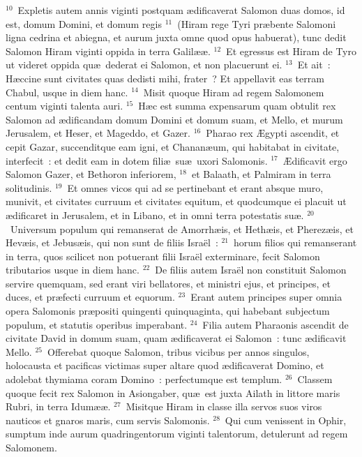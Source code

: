 ${}^{10}$~Expletis autem annis viginti postquam \ae dificaverat Salomon duas domos, id est, domum Domini, et domum regis
${}^{11}$~(Hiram rege Tyri pr\ae bente Salomoni ligna cedrina et abiegna, et aurum juxta omne quod opus habuerat), tunc dedit Salomon Hiram viginti oppida in terra Galil\ae \ae .
${}^{12}$~Et egressus est Hiram de Tyro ut videret oppida qu\ae\ dederat ei Salomon, et non placuerunt ei.
${}^{13}$~Et ait~: H\ae ccine sunt civitates quas dedisti mihi, frater~? Et appellavit eas terram Chabul, usque in diem hanc.
${}^{14}$~Misit quoque Hiram ad regem Salomonem centum viginti talenta auri.
${}^{15}$~H\ae c est summa expensarum quam obtulit rex Salomon ad \ae dificandam domum Domini et domum suam, et Mello, et murum Jerusalem, et Heser, et Mageddo, et Gazer.
${}^{16}$~Pharao rex \AE gypti ascendit, et cepit Gazar, succenditque eam igni, et Chanan\ae um, qui habitabat in civitate, interfecit~: et dedit eam in dotem fili\ae\ su\ae\ uxori Salomonis.
${}^{17}$~\AE dificavit ergo Salomon Gazer, et Bethoron inferiorem,
${}^{18}$~et Balaath, et Palmiram in terra solitudinis.
${}^{19}$~Et omnes vicos qui ad se pertinebant et erant absque muro, munivit, et civitates curruum et civitates equitum, et quodcumque ei placuit ut \ae dificaret in Jerusalem, et in Libano, et in omni terra potestatis su\ae .
${}^{20}$~Universum populum qui remanserat de Amorrh\ae is, et Heth\ae is, et Pherez\ae is, et Hev\ae is, et Jebus\ae is, qui non sunt de filiis Isra\"el~:
${}^{21}$~horum filios qui remanserant in terra, quos scilicet non potuerant filii Isra\"el exterminare, fecit Salomon tributarios usque in diem hanc.
${}^{22}$~De filiis autem Isra\"el non constituit Salomon servire quemquam, sed erant viri bellatores, et ministri ejus, et principes, et duces, et pr\ae fecti curruum et equorum.
${}^{23}$~Erant autem principes super omnia opera Salomonis pr\ae positi quingenti quinquaginta, qui habebant subjectum populum, et statutis operibus imperabant.
${}^{24}$~Filia autem Pharaonis ascendit de civitate David in domum suam, quam \ae dificaverat ei Salomon~: tunc \ae dificavit Mello.
${}^{25}$~Offerebat quoque Salomon, tribus vicibus per annos singulos, holocausta et pacificas victimas super altare quod \ae dificaverat Domino, et adolebat thymiama coram Domino~: perfectumque est templum.
${}^{26}$~Classem quoque fecit rex Salomon in Asiongaber, qu\ae\ est juxta Ailath in littore maris Rubri, in terra Idum\ae \ae .
${}^{27}$~Misitque Hiram in classe illa servos suos viros nauticos et gnaros maris, cum servis Salomonis.
${}^{28}$~Qui cum venissent in Ophir, sumptum inde aurum quadringentorum viginti talentorum, detulerunt ad regem Salomonem.
